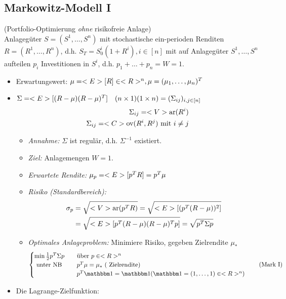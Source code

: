 \subsection*{Markowitz-Modell I}
(Portfolio-Optimierung \emph{ohne} risikofreie Anlage)\\
Anlagegüter $S = (S^1, \dots, S^n)$ mit stochastische ein-perioden Renditen $R = (R^1, \dots, R^n)$, d.h. $S_T = S_0^i(1+R^i), i \in [n]$ mit auf Anlagegüter $S^1, \dots, S^n$ aufteilen $p_i$ Investitionen in $S^i$, d.h. $p_1 + \dots + p_n = W = 1$.
\begin{itemize}
	\item Erwartungswert: $\mu = <E>[R] \in <R>^n, \mu = (\mu_1, \dots, \mu_n)^T$
	\item $\Sigma = <E>[(R-\mu)(R-\mu)^T]\quad (n\times 1)(1\times n) = (\Sigma_{ij})_{i,j \in [n]}$
	\begin{align*}
		\Sigma_{ij} = <V>\text{ar}(R^i)\\
		\Sigma_{ij} = <C>\text{ov}(R^{i},R^j) \text{ mit } i \neq j
	\end{align*}
	\begin{itemize}
		\item \emph{Annahme:} $\Sigma$ ist regulär, d.h. $\Sigma^{-1}$ existiert.
		\item \emph{Ziel:} Anlagemengen $W=1$. 
		\item \emph{Erwartete Rendite:} $\mu_p = <E>[p^T R] = p^T \mu$
		\item \emph{Risiko (Standardbereich):}
		\begin{align*}
			\sigma_p &= \sqrt{<V>\text{ar}(p^T R)} = \sqrt{<E>[(p^T (R-\mu))^2]}\\
			&=\sqrt{<E>[p^T (R-\mu)(R-\mu)^Tp]} = \sqrt{p^T \Sigma p}
		\end{align*}
		\item \emph{Optimales Anlageproblem:} Minimiere Risiko, gegeben Zielrendite $\mu_{\ast}$
		\begin{align}
			\begin{cases}
				\min \half p^T \Sigma p & \quad\text{über } p \in \R^n\\
				\text{ unter NB} &\quad p^T \mu = \mu_{\ast} \text{ ( Zielrendite)}\\
				&\quad p^T \indi = \indi (\indi = (1, \dots, 1) \in \R^n)
			\end{cases} \label{eq_Markow_one}\tag{Mark I}
		\end{align}
	\end{itemize}
	\item Die Lagrange-Zielfunktion: 
\begin{align*}

\end{align*}
\end{itemize}
